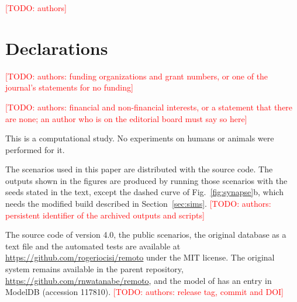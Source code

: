 \documentclass[pdflatex,sn-apa,iicol]{sn-jnl}
\newcommand{\TODO}[1]{\textcolor{red}{[TODO: #1]}}
\begin{document}
\TODO{authors}

\section*{Declarations}



\TODO{authors: funding organizations and grant numbers, or one of the journal's statements for no funding}


\TODO{authors: financial and non-financial interests, or a statement that there are none; an author who is on the editorial board must say so here}


This is a computational study. No experiments on humans or animals were performed for it.


The scenarios used in this paper are distributed with the source code. The outputs shown in the figures are produced by running those scenarios with the seeds stated in the text, except the dashed curve of Fig.~\ref{fig:synapse}b, which needs the modified build described in Section~\ref{sec:sims}.
\TODO{authors: persistent identifier of the archived outputs and scripts}


The source code of version 4.0, the public scenarios, the original database as a text file and the automated tests are available at \url{https://github.com/rogeriocisi/remoto} under the MIT license. The original system remains available in the parent repository, \url{https://github.com/rnwatanabe/remoto}, and the model of \citet{Cisi2008} has an entry in ModelDB (accession 117810).
\TODO{authors: release tag, commit and DOI}
\end{document}
